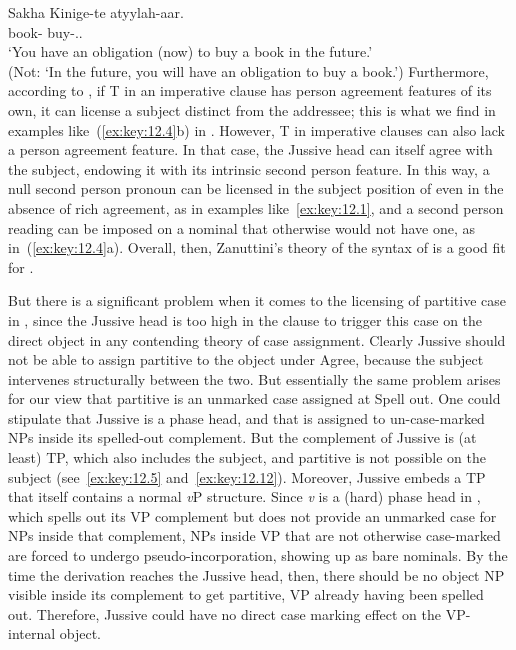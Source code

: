 \documentclass[output=paper]{langsci/langscibook}
\begin{document}
\ea\label{ex:key:12.13}Sakha
    \sn
	\gll Kinige-te  atyylah-aar.\\
        book-\Part{}  buy-\Fut{}.\Imp{}.\Ssg{}\\
	\glt ‘You have an obligation (now) to buy a book in the future.’\\
		(Not: ‘In the future, you will have an obligation to buy a book.’)
\z
Furthermore, according to \citet{Zanuttini2008}, if T in an imperative clause
has person agreement features of its own, it can license a subject distinct
from the addressee; this is what we find in examples like~(\ref{ex:key:12.4}b) in .
However, T in imperative clauses can also lack a person agreement feature. In
that case, the Jussive head can itself agree with the subject, endowing it with
its intrinsic second person feature. In this way, a null second person pronoun
can be licensed in the subject position of  even in the absence of
rich agreement, as in examples like~\eqref{ex:key:12.1}, and a second person reading can be
imposed on a nominal that otherwise would not have one, as in~(\ref{ex:key:12.4}a). Overall,
then, Zanuttini’s theory of the syntax of  is a good fit for .

But there is a significant problem when it comes to the licensing of partitive
case in  , since the Jussive head is too high in the clause to
trigger this case on the direct object in any contending theory of case
assignment. Clearly Jussive should not be able to assign partitive to the
object under Agree, because the subject intervenes structurally between the
two. But essentially the same problem arises for our view that partitive is an
unmarked case assigned at Spell out. One could stipulate that Jussive is a
phase head, and that  is assigned to un-case-marked NPs inside
its spelled-out complement. But the complement of Jussive is (at least) TP,
which also includes the subject, and partitive is not possible on the subject
(see~\eqref{ex:key:12.5} and~\eqref{ex:key:12.12}). Moreover, Jussive embeds a TP that itself contains a normal
\emph{v}P structure. Since \emph{v} is a (hard) phase head in , which spells out its VP
complement but does not provide an unmarked case for NPs inside that
complement, NPs inside VP that are not otherwise case-marked are forced to
undergo pseudo-incorporation, showing up as bare nominals. By the time the
derivation reaches the Jussive head, then, there should be no object NP visible
inside its complement to get partitive, VP already having been spelled out.
Therefore, Jussive could have no direct case marking effect on the VP-internal
object.
\end{document}
